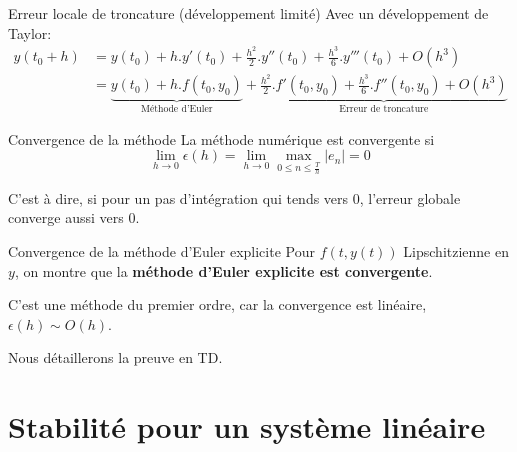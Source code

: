 \documentclass{beamer}
\begin{document}
\begin{frame}{Erreur locale de troncature (développement limité)}
    Avec un développement de Taylor:
    \begin{align*}
        y(t_0 + h) & = y(t_0) + h.y'(t_0) + \frac{h^2}{2}.y''(t_0) + \frac{h^3}{6}.y'''(t_0) + O(h^3)                                                                                              \\
                   & = \underbrace{y(t_0) + h.f(t_0, y_0)}_{\text{Méthode d'Euler}} + \underbrace{\frac{h^2}{2}.f'(t_0, y_0) + \frac{h^3}{6}.f''(t_0, y_0) + O(h^3)}_{\text{Erreur de troncature}}
    \end{align*}
\end{frame}

\begin{frame}{Convergence de la méthode}
    La méthode numérique est convergente si
    \[\lim_{h \rightarrow 0} \epsilon(h) = \lim_{h \rightarrow 0} \max_{0 \leq n \leq \frac{T}{h}} |e_n| = 0 \]

    C'est à dire, si pour un pas d'intégration qui tends vers 0, l'erreur globale converge aussi vers 0.

\end{frame}


\begin{frame}{Convergence de la méthode d'Euler explicite}
    Pour $f(t,y(t))$ Lipschitzienne en $y$, on montre que la \textbf{méthode d'Euler explicite est convergente}.

    C'est une méthode du premier ordre, car la convergence est linéaire, $\epsilon(h) \sim O(h)$.

    Nous détaillerons la preuve en TD.

\end{frame}


\section{Stabilité pour un système linéaire}
\end{document}
